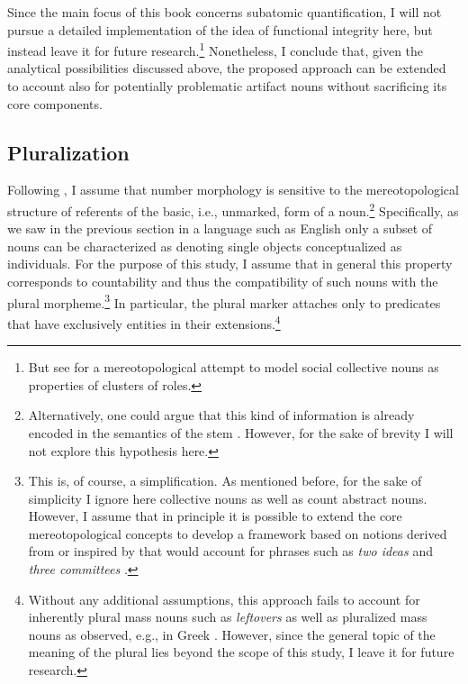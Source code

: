 	Since the main focus of this book concerns subatomic quantification, I will not pursue a detailed implementation of the idea of functional integrity here, but instead leave it for future research.\footnote{But see \citet{wagiel-toappear-slavic} for a mereotopological attempt to model social collective nouns as properties of clusters of roles.}  Nonetheless, I conclude that, given the analytical possibilities discussed above, the proposed approach can be extended to account also for potentially problematic artifact nouns without sacrificing its core components. 
	
	\subsection{Pluralization}\label{sec:pluralization}
	
	Following \citet{grimm2012number}, I assume that number morphology is sensitive to the mereotopological structure of referents of the basic, i.e., unmarked, form of a noun.\footnote{Alternatively, one could argue that this kind of information is already encoded in the semantics of the stem \citep[pace, e.g.,][]{pelletier_schubert1989mass,borer2005name}. However, for the sake of brevity I will not explore this hypothesis here.} Specifically, as we saw in the previous section in a language such as English only a subset of nouns can be characterized as denoting single objects conceptualized as  individuals. For the purpose of this study, I assume that in general this property corresponds to countability and thus the compatibility of such nouns with the plural morpheme.\footnote{This is, of course, a simplification. As mentioned before, for the sake of simplicity I ignore here collective nouns as well as count abstract nouns. However, I assume that in principle it is possible to extend the core mereotopological concepts to develop a framework based on notions derived from or inspired by  that would account for phrases such as \textit{two ideas} and \textit{three committees} \citep[see also][]{grimm2014individuating}.} In particular, the plural marker attaches only to predicates that have exclusively  entities in their extensions.\footnote{Without any additional assumptions, this approach fails to account for inherently plural mass nouns such as \textit{leftovers} \citep{acquaviva2008lexical} as well as pluralized mass nouns as observed, e.g., in Greek \citep{tsoulas2009grammar}. However, since the general topic of the meaning of the plural lies beyond the scope of this study, I leave it for future research.} 
	
